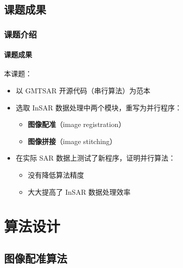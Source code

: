 \documentclass{beamer}
\begin{document}
\subsection{课题成果}
\begin{frame}
    \frametitle{课题介绍}
    \framesubtitle{课题成果}

    本课题：
    \begin{itemize}
        \item 以 GMTSAR 开源代码（串行算法）为范本
        \item 选取 InSAR 数据处理中两个模块，重写为并行程序：
        \begin{itemize}
            \item \textbf{图像配准}（image registration）
            \item \textbf{图像拼接}（image stitching）
        \end{itemize}
        \item 在实际 SAR 数据上测试了新程序，证明并行算法：
        \begin{itemize}
            \item 没有降低算法精度
            \item 大大提高了 InSAR 数据处理效率
        \end{itemize}
    \end{itemize}
\end{frame}


\section{算法设计}
\subsection{图像配准算法}
\end{document}
